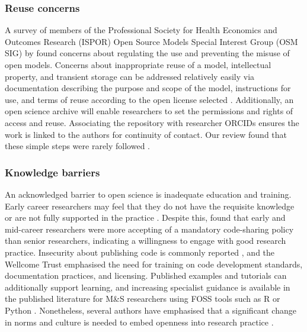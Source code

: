 \documentclass[]{interact}
\theoremstyle{plain}%
\theoremstyle{definition}
\theoremstyle{remark}
\begin{document}
\subsubsection{Reuse concerns}
A survey of members of the Professional Society for Health Economics and Outcomes Research (ISPOR) Open Source Models Special Interest Group (OSM SIG) 
by \cite{POUWELS2022473} found concerns about regulating the use and preventing the misuse of open models. Concerns about inappropriate reuse of a model, intellectual property, and transient storage can be addressed relatively easily via documentation describing the purpose and scope of the model, instructions for use, and terms of reuse according to the open license selected \citep{gomes2022don, hrynaszkiewicz2021survey}. Additionally, an open science archive will enable researchers to set the permissions and rights of access and reuse. Associating the repository with researcher {\color{red}ORCIDs} ensures the work is linked to the authors for continuity of contact. Our review found that these simple steps were rarely followed \citep{monks2023computer}.


\subsubsection{Knowledge barriers}
An acknowledged barrier to open science is inadequate education and training. Early career researchers may feel that they do not have the requisite knowledge or are not fully supported in the practice \citep{Zecevic2021, gomes2022don}. Despite this, \cite{hrynaszkiewicz2021survey} found that early and mid-career researchers were more accepting of a mandatory code-sharing policy than senior researchers, indicating a willingness to engage with good research practice. Insecurity about publishing code is commonly reported \citep{gomes2022don, rrepo24866, hrynaszkiewicz2021survey}, and the Wellcome Trust \citep{rrepo24866} emphasised the need for training on code development standards, documentation practices, and licensing. Published examples and tutorials can additionally support learning, and increasing specialist guidance is available in the published literature for M\&S researchers using FOSS tools such as R or Python \citep{tom_monks_2023_8101984, alison_harper_2023_8011462, wojciechowski2015interactive, shiney_paper, knight2022applied, palmer_geraint_2021_4601529}. Nonetheless, several authors have emphasised that a significant change in norms and culture is needed to embed openness into research practice \citep{janssen2020code, Zecevic2021}. 
\end{document}
